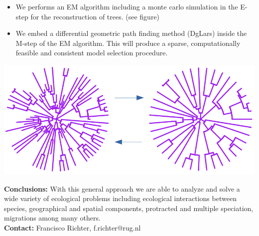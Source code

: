 \documentclass[a0paper,portrait]{baposter}
\begin{document}
\begin{poster}
{\vspace{-0.4cm}
\begin{itemize}
\item %
We performs an EM algorithm including a monte carlo simulation in the E-step for the reconstruction of trees. (see figure)
\vspace{-0.35cm}
\item We embed a differential geometric path finding method (DgLars) inside the M-step of the EM algorithm. This will produce a sparse, computationally feasible and consistent model selection procedure.  
\end{itemize}
\vspace{-0.7cm}
\begin{center}
                \includegraphics[width=0.6\linewidth]{figures/fco.png}
				\end{center}
\vspace{-0.45cm}
\textbf{Conclusions:} With this general approach we are able to analyze and solve a wide variety of ecological problems including ecological interactions between species, geographical and spatial components, protracted and multiple speciation, migrations among many others.\\  
\textbf{Contact: } Francisco Richter, f.richter@rug.nl
}


\end{poster}
\end{document}

